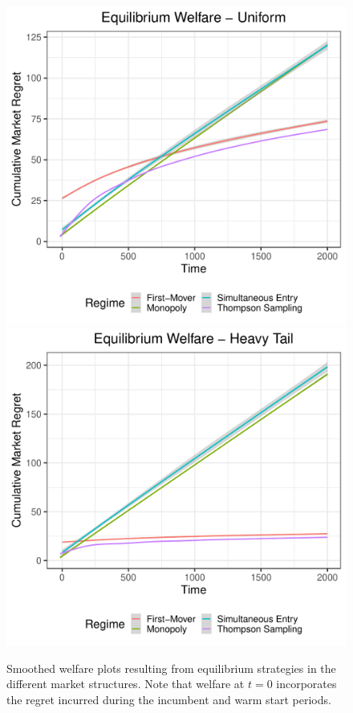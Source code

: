 \documentclass[../competing_bandits_with_appendix.tex]{subfiles}
\begin{document}
\begin{figure}
\centering
\includegraphics[scale=0.35]{ec19paper/figures/unif_eq_welfare}
\includegraphics[scale=0.35]{ec19paper/figures/ht_eq_welfare}
\caption{Smoothed welfare plots resulting from equilibrium strategies in the different market structures. Note that welfare at $t = 0$ incorporates the regret incurred during the incumbent and warm start periods.}
\label{eq_regret}
\end{figure}
\end{document}
